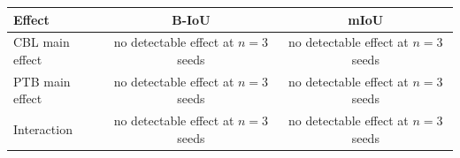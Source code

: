 \begin{tabular}{lcc}
\toprule
Effect & B-IoU & mIoU \\
\midrule
CBL main effect & no detectable effect at $n{=}3$ seeds & no detectable effect at $n{=}3$ seeds \\
PTB main effect & no detectable effect at $n{=}3$ seeds & no detectable effect at $n{=}3$ seeds \\
Interaction & no detectable effect at $n{=}3$ seeds & no detectable effect at $n{=}3$ seeds \\
\bottomrule
\end{tabular}
